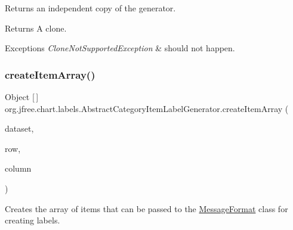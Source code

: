 Returns an independent copy of the generator.

\begin{DoxyReturn}{Returns}
A clone.
\end{DoxyReturn}

\begin{DoxyExceptions}{Exceptions}
{\em Clone\+Not\+Supported\+Exception} & should not happen. \\
\hline
\end{DoxyExceptions}
\mbox{\label{classorg_1_1jfree_1_1chart_1_1labels_1_1_abstract_category_item_label_generator_ac092296d76ccb5e9df9737148139e961}} 
\subsubsection{\texorpdfstring{create\+Item\+Array()}{createItemArray()}}
{\footnotesize\ttfamily Object \mbox{[}$\,$\mbox{]} org.\+jfree.\+chart.\+labels.\+Abstract\+Category\+Item\+Label\+Generator.\+create\+Item\+Array (\begin{DoxyParamCaption}\item[{\mbox{\hyperlink{interfaceorg_1_1jfree_1_1data_1_1category_1_1_category_dataset}{Category\+Dataset}}}]{dataset,  }\item[{int}]{row,  }\item[{int}]{column }\end{DoxyParamCaption})\hspace{0.3cm}{\ttfamily [protected]}}

Creates the array of items that can be passed to the \mbox{\hyperlink{}{Message\+Format}} class for creating labels.


